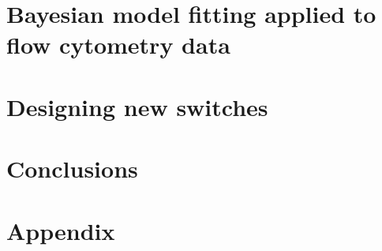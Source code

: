 \documentclass[]{phdthesis}
\begin{document}
\mainmatter*
\chapter{Bayesian model fitting applied to flow cytometry data}



\mainmatter*
\chapter{Designing new switches}


\mainmatter*
\chapter{Conclusions}


\printbibliography

\appendix*
\chapter{Appendix}

\end{document}
